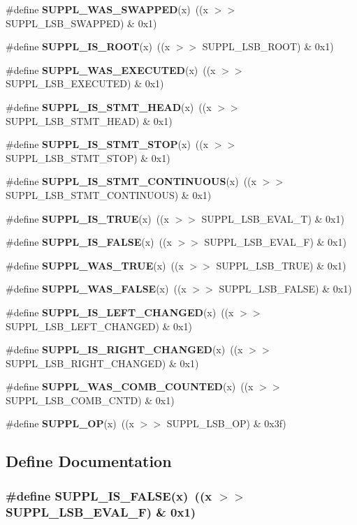 \begin{CompactItemize}
\#define {\bf SUPPL\_\-WAS\_\-SWAPPED}(x)\ ((x $>$$>$ SUPPL\_\-LSB\_\-SWAPPED) \& 0x1)
\item 
\#define {\bf SUPPL\_\-IS\_\-ROOT}(x)\ ((x $>$$>$ SUPPL\_\-LSB\_\-ROOT) \& 0x1)
\item 
\#define {\bf SUPPL\_\-WAS\_\-EXECUTED}(x)\ ((x $>$$>$ SUPPL\_\-LSB\_\-EXECUTED) \& 0x1)
\item 
\#define {\bf SUPPL\_\-IS\_\-STMT\_\-HEAD}(x)\ ((x $>$$>$ SUPPL\_\-LSB\_\-STMT\_\-HEAD) \& 0x1)
\item 
\#define {\bf SUPPL\_\-IS\_\-STMT\_\-STOP}(x)\ ((x $>$$>$ SUPPL\_\-LSB\_\-STMT\_\-STOP) \& 0x1)
\item 
\#define {\bf SUPPL\_\-IS\_\-STMT\_\-CONTINUOUS}(x)\ ((x $>$$>$ SUPPL\_\-LSB\_\-STMT\_\-CONTINUOUS) \& 0x1)
\item 
\#define {\bf SUPPL\_\-IS\_\-TRUE}(x)\ ((x $>$$>$ SUPPL\_\-LSB\_\-EVAL\_\-T) \& 0x1)
\item 
\#define {\bf SUPPL\_\-IS\_\-FALSE}(x)\ ((x $>$$>$ SUPPL\_\-LSB\_\-EVAL\_\-F) \& 0x1)
\item 
\#define {\bf SUPPL\_\-WAS\_\-TRUE}(x)\ ((x $>$$>$ SUPPL\_\-LSB\_\-TRUE) \& 0x1)
\item 
\#define {\bf SUPPL\_\-WAS\_\-FALSE}(x)\ ((x $>$$>$ SUPPL\_\-LSB\_\-FALSE) \& 0x1)
\item 
\#define {\bf SUPPL\_\-IS\_\-LEFT\_\-CHANGED}(x)\ ((x $>$$>$ SUPPL\_\-LSB\_\-LEFT\_\-CHANGED) \& 0x1)
\item 
\#define {\bf SUPPL\_\-IS\_\-RIGHT\_\-CHANGED}(x)\ ((x $>$$>$ SUPPL\_\-LSB\_\-RIGHT\_\-CHANGED) \& 0x1)
\item 
\#define {\bf SUPPL\_\-WAS\_\-COMB\_\-COUNTED}(x)\ ((x $>$$>$ SUPPL\_\-LSB\_\-COMB\_\-CNTD) \& 0x1)
\item 
\#define {\bf SUPPL\_\-OP}(x)\ ((x $>$$>$ SUPPL\_\-LSB\_\-OP) \& 0x3f)
\end{CompactItemize}


\subsection{Define Documentation}
\subsubsection{\setlength{\rightskip}{0pt plus 5cm}\#define SUPPL\_\-IS\_\-FALSE(x)\ ((x $>$$>$ SUPPL\_\-LSB\_\-EVAL\_\-F) \& 0x1)}\label{group__expr__suppl_a28}


